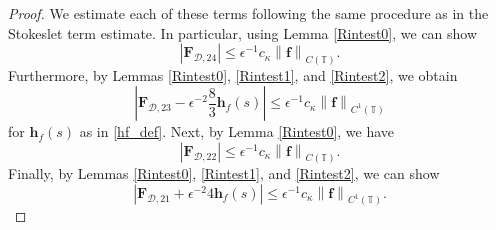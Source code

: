 \documentclass[11pt]{article}
\numberwithin{equation}{section}
\newcommand{\T}{\mathbb{T}}
\newcommand{\abs}[1]{\left\lvert #1 \right\rvert}
\newcommand{\norm}[1]{\left\lVert #1 \right\rVert}
\newcommand{\mc}[1]{\mathcal{#1}}
\theoremstyle{definition}
\begin{document}
\begin{proof}
We estimate each of these terms following the same procedure as in the Stokeslet term estimate. In particular, using Lemma \ref{Rintest0}, we can show
\begin{equation}\label{FD24_est}
\abs{\bm{F}_{\mc{D},24}} \le \epsilon^{-1}c_\kappa \norm{\bm{f}}_{C(\T)}.
\end{equation}
Furthermore, by Lemmas \ref{Rintest0}, \ref{Rintest1}, and \ref{Rintest2}, we obtain
\begin{equation}\label{FD23_est}
\abs{\bm{F}_{\mc{D},23}- \epsilon^{-2}\frac{8}{3}\bm{h}_f(s)} \le \epsilon^{-1}c_\kappa \norm{\bm{f}}_{C^1(\T)}
\end{equation}
for $\bm{h}_f(s)$ as in \eqref{hf_def}. Next, by Lemma \ref{Rintest0}, we have
\begin{equation}\label{FD22_est}
\abs{\bm{F}_{\mc{D},22}} \le \epsilon^{-1}c_\kappa\norm{\bm{f}}_{C(\T)}.
\end{equation}
Finally, by Lemmas \ref{Rintest0}, \ref{Rintest1}, and \ref{Rintest2}, we can show
\begin{equation}\label{FD21_est}
\abs{\bm{F}_{\mc{D},21} +\epsilon^{-2}4\bm{h}_f(s)} \le \epsilon^{-1}c_\kappa \norm{\bm{f}}_{C^1(\T)}.
\end{equation}


\end{proof}
\end{document}
